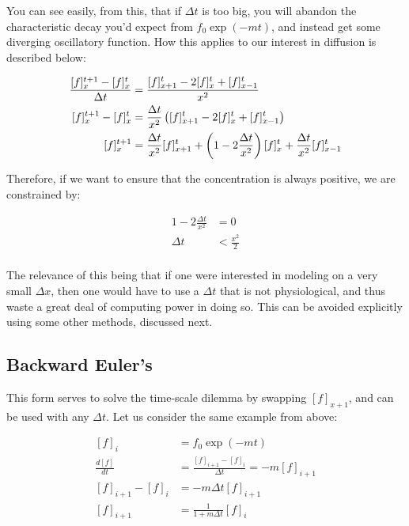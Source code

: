 You can see easily, from this, that if $\Delta t$ is too big, you will abandon the characteristic decay you'd expect from $f_0\exp(-mt)$, and instead get some diverging oscillatory function. How this applies to our interest in diffusion is described below: 

\begin{equation} \label{diff3}
\begin{split}
\frac{[f]^{t+1}_{x} - [f]^{t}_{x}}{\Delta t} &= \frac{[f]^{t}_{x+1} - 2[f]^{t}_x + [f]^{t}_{x - 1}}{x^2}\\
[f]^{t+1}_{x} - [f]^{t}_{x} &= \frac{\Delta t}{x^2} \left([f]^{t}_{x+1} - 2[f]^{t}_x + [f]^{t}_{x - 1}\right) \\
[f]^{t+1}_{x} &= \frac{\Delta t}{x^2} [f]^{t}_{x+1} + \left(1 - 2\frac{\Delta t}{x^2}\right)[f]^{t}_x + \frac{\Delta t}{x^2}[f]^{t}_{x - 1} \\
\end{split}
\end{equation}

Therefore, if we want to ensure that the concentration is always positive, we are constrained by: 

\begin{equation} \label{diff4}
\begin{split}
1 - 2\frac{\Delta t}{x^2} & = 0\\
\Delta t & < \frac{x^2}{2}\\
\end{split}
\end{equation}

The relevance of this being that if one were interested in modeling on a very small $\Delta x$, then one would have to use a $\Delta t$ that is not physiological, and thus waste a great deal of computing power in doing so. This can be avoided explicitly using some other methods, discussed next. 

\subsection{Backward Euler's} This form serves to solve the time-scale dilemma by swapping $[f]_{x+1}$, and can be used with any $\Delta t$. Let us consider the same example from above: 

\begin{equation} \label{diff5}
\begin{split}
[f]_i & = f_0\exp(-mt) \\
\frac{d[f]}{dt} & = \frac{[f]_{i+1} - [f]_{i}}{\Delta t} = -m[f]_{i+1} \\
[f]_{i+1} - [f]_{i} & = -m\Delta t[f]_{i+1} \\
[f]_{i+1} & = \frac{1}{1+m\Delta t}[f]_{i} \\
\end{split}
\end{equation}

